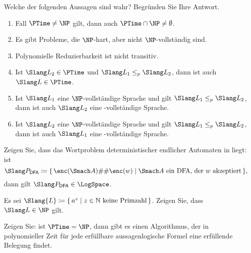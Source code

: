 \documentclass[german]{latteachCD}[2017/03/28]
\begin{document}
\vspace*{0.5\baselineskip}

\setcounter{exercise}{0}

\begin{exercise}
  Welche der folgenden Aussagen sind wahr?  Begründen Sie Ihre Antwort.
  \begin{enumerate}
  \item Fall $\PTime \neq \NP$ gilt, dann auch $\PTime \cap \NP \neq \emptyset$.
  \item Es gibt Probleme, die $\NP$-hart, aber nicht $\NP$-vollständig sind.
  \item Polynomielle Reduzierbarkeit ist nicht transitiv.
  \item Ist $\Slang L_{2} \in \PTime$ und $\Slang L_{1} \leq_{p} \Slang L_{2}$,
    dann ist auch $\Slang L \in \PTime$.
  \item Ist $\Slang L_{1}$ eine $\NP$-vollständige Sprache und gilt $\Slang
    L_{1} \leq_{p} \Slang L_{2}$, dann ist auch $\Slang L_{2}$ eine
    \NP-vollständige Sprache.
  \item Ist $\Slang L_{2}$ eine $\NP$-vollständige Sprache und gilt $\Slang
    L_{1} \leq_{p} \Slang L_{2}$, dann ist auch $\Slang L_{1}$ eine
    \NP-vollständige Sprache.
  \end{enumerate}
\end{exercise}

\begin{exercise}
  Zeigen Sie, dass das Wortproblem deterministischer endlicher Automaten in
  \LogSpace liegt: ist
  \begin{equation*}
    \Slang P_{\mathsf{DFA}} \coloneqq \{\,\enc(\Smach A)\#\#\enc(w) \mid
    \Smach A \text{ ein DFA, der $w$ akzeptiert}\,\},
  \end{equation*}
  dann gilt $\Slang P_{\mathsf{DFA}} \in \LogSpace$.
\end{exercise}

\begin{exercise}
  Es sei $\Slang{L} \coloneqq \{\,a^{z} \mid z \in \mathbb N \text{ keine
    Primzahl}\,\}$.  Zeigen Sie, dass $\Slang L \in \NP$ gilt.
\end{exercise}

\begin{exercise}
  Zeigen Sie: ist $\PTime = \NP$, dann gibt es einen Algorithmus, der in
  polynomieller Zeit für jede erfüllbare aussagenlogische Formel eine erfüllende
  Belegung findet.
\end{exercise}
\end{document}
